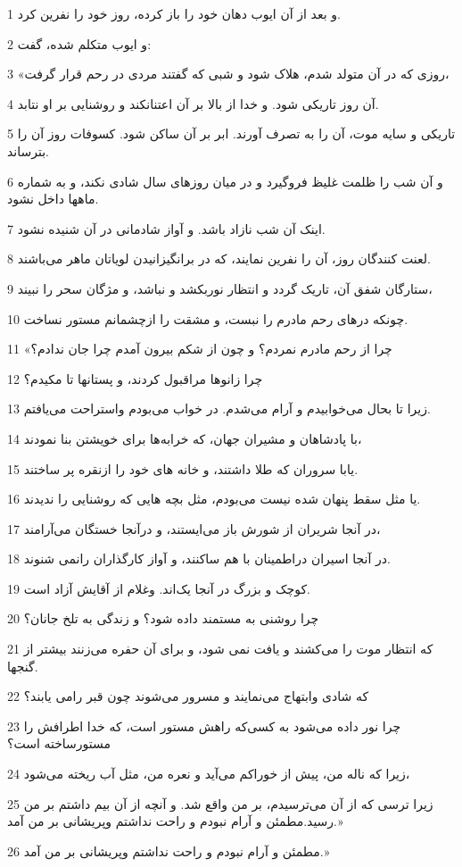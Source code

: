 \par 1 و بعد از آن ایوب دهان خود را باز کرده، روز خود را نفرین کرد.
\par 2 و ایوب متکلم شده، گفت:
\par 3 «روزی که در آن متولد شدم، هلاک شود و شبی که گفتند مردی در رحم قرار گرفت،
\par 4 آن روز تاریکی شود. و خدا از بالا بر آن اعتنانکند و روشنایی بر او نتابد.
\par 5 تاریکی و سایه موت، آن را به تصرف آورند. ابر بر آن ساکن شود. کسوفات روز آن را بترساند.
\par 6 و آن شب را ظلمت غلیظ فرو‌گیرد و در میان روزهای سال شادی نکند، و به شماره ماهها داخل نشود.
\par 7 اینک آن شب نازاد باشد. و آواز شادمانی در آن شنیده نشود.
\par 8 لعنت کنندگان روز، آن را نفرین نمایند، که در برانگیزانیدن لویاتان ماهر می‌باشند.
\par 9 ستارگان شفق آن، تاریک گردد و انتظار نوربکشد و نباشد، و مژگان سحر را نبیند،
\par 10 چونکه درهای رحم مادرم را نبست، و مشقت را ازچشمانم مستور نساخت.
\par 11 «چرا از رحم مادرم نمردم؟ و چون از شکم بیرون آمدم چرا جان ندادم؟
\par 12 چرا زانوها مراقبول کردند، و پستانها تا مکیدم؟
\par 13 زیرا تا بحال می‌خوابیدم و آرام می‌شدم. در خواب می‌بودم واستراحت می‌یافتم.
\par 14 با پادشاهان و مشیران جهان، که خرابه‌ها برای خویشتن بنا نمودند،
\par 15 یابا سروران که طلا داشتند، و خانه های خود را ازنقره پر ساختند.
\par 16 یا مثل سقط پنهان شده نیست می‌بودم، مثل بچه هایی که روشنایی را ندیدند.
\par 17 در آنجا شریران از شورش باز می‌ایستند، و درآنجا خستگان می‌آرامند،
\par 18 در آنجا اسیران دراطمینان با هم ساکنند، و آواز کارگذاران رانمی شنوند.
\par 19 کوچک و بزرگ در آنجا یک‌اند. وغلام از آقایش آزاد است.
\par 20 چرا روشنی به مستمند داده شود؟ و زندگی به تلخ جانان؟
\par 21 که انتظار موت را می‌کشند و یافت نمی شود، و برای آن حفره می‌زنند بیشتر از گنجها.
\par 22 که شادی وابتهاج می‌نمایند و مسرور می‌شوند چون قبر رامی یابند؟
\par 23 چرا نور داده می‌شود به کسی‌که راهش مستور است، که خدا اطرافش را مستورساخته است؟
\par 24 زیرا که ناله من، پیش از خوراکم می‌آید و نعره من، مثل آب ریخته می‌شود،
\par 25 زیرا ترسی که از آن می‌ترسیدم، بر من واقع شد. و آنچه از آن بیم داشتم بر من رسید.مطمئن و آرام نبودم و راحت نداشتم وپریشانی بر من آمد.»
\par 26 مطمئن و آرام نبودم و راحت نداشتم وپریشانی بر من آمد.»
 
